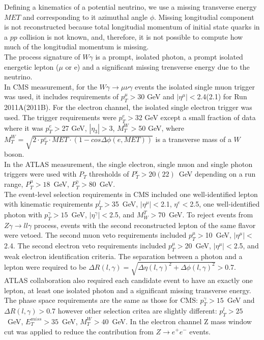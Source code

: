 Defining a kinematics of a potential neutrino, we use a missing transverse energy $MET$ and corresponding to it azimuthal angle $\phi$. Missing longitudial component is not reconstructed because total longitudial momentum of initial state quarks in a $pp$ collision is not known, and, therefore, it is not possible to compute how much of the longitudial momentum is missing.\\  

The process signature of $W\gamma$ is a prompt, isolated photon, a prompt isolated energetic lepton ($\mu$ or e) and a significant missing trensverse energy due to the neutrino. \\

In CMS measurement, for the $W\gamma\rightarrow\mu\nu\gamma$ events the isolated single muon trigger was used, it includes requirements of $p_T^{\mu}>$30 GeV and $|\eta^{\mu}|<$2.4(2.1) for Run 2011A(2011B). For the electron channel, the isolated single electron trigger was used. The trigger requirements were $p_T^e>$32 GeV except a small fraction of data where it was $p_T^e>$27 GeV, $|\eta_3|>$3, $M_T^W>$50 GeV, where $M_T^W=\sqrt{2 \cdot p_T^e \cdot MET \cdot (1-cos\Delta\phi(e,MET))}$ is a transverse mass of a $W$ boson.\\

In the ATLAS measurement, the single electron, single muon and single photon triggers were used with $P_T$ thresholds of $P_T^e>20(22)$~GeV depending on a run range, $P_T^\mu>18$~GeV, $P_T^\gamma>80$~GeV.\\

The event-level selection requirements in CMS included one well-identified lepton with kinematic requirements $p_T^l>$35~GeV, $|\eta^\mu|<$2.1, $\eta^e<$2.5, one well-identified photon with $p_T^\gamma>15$~GeV, $|\eta^\gamma|<$2.5, and $M_W^T>$70~GeV. To reject events from $Z\gamma\rightarrow ll\gamma$ process, events with the second reconstructed lepton of the same flavor were vetoed. The second muon veto requirements included $p_T^\mu>$10~GeV, $|\eta^\mu|<$2.4. The second electron veto requirements included $p_T^\mu>$20~GeV, $|\eta^\mu|<$2.5, and weak electron identification criteria. The separation between a photon and a lepton were required to be $\Delta R(l,\gamma) = \sqrt{\Delta \eta(l,\gamma)^2 + \Delta \phi(l,\gamma)^2}>$0.7.\\  

ATLAS collaboration also required each candidate event to have an exactly one lepton, at least one isolated photon and a significant missing transverse energy. The phase space requirements are the same as those for CMS: $p_T^{\gamma}>15$~GeV and $\Delta R(l,\gamma)>$0.7 however other selection critea are slightly different: $p_T^l>25$~GeV, $E_T^{miss}>35$~GeV, $M_T^W>40$~GeV. In the electron channel Z mass window cut was applied to reduce the contribution from $Z\rightarrow e^+e^-$ events.\\

